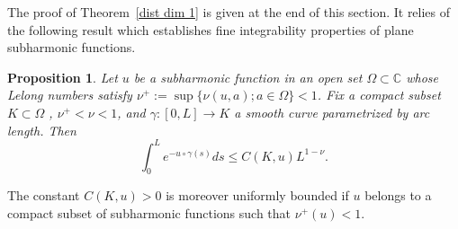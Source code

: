 \documentclass[a4paper,11pt,leqno,english]{smfart}
\theoremstyle{plain}
\theoremstyle{plain}
\numberwithin{equation}{section} %
\numberwithin{figure}{section} %
\theoremstyle{plain}
\newtheorem{prop}[thm]{Proposition} %
\theoremstyle{plain}
\theoremstyle{remark}
\theoremstyle{remark}
\theoremstyle{definition}
\theoremstyle{plain}
\theoremstyle{plain}
\theoremstyle{definition}
\newcommand{\C}{{\mathbb{C}}}
\begin{document}
The proof of Theorem~\ref{dist dim 1} is given at the end of this section. It relies of the following result which establishes fine integrability properties of plane subharmonic functions.
 
 \begin{prop}  
 \label{prop:ExpInteg} 
Let $u$ be a  subharmonic function in an open set $\Omega \subset \C$ whose Lelong numbers 
satisfy $\nu^+:=\sup \{\nu (u,a) ; a \in \Omega \}<1$.
Fix a compact subset $K \subset \Omega$ , $\nu^+<\nu<1$, 
and $\gamma : [0,L]  \longrightarrow K$  a smooth curve parametrized  by arc length.  
Then
 $$
 \int_0^L e^{- u \circ \gamma(s)} d s \leq C(K,u)  L^{1- \nu}.
$$
  \end{prop}
  
 The constant $C(K,u)>0$ is moreover uniformly bounded if $u$ belongs to a compact subset of 
 subharmonic functions such that $\nu^+(u)<1$.
  
  
  
\end{document}
